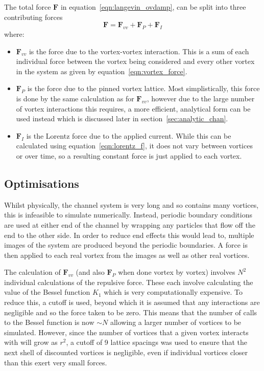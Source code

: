 \documentclass{article}
\numberwithin{equation}{section}
\begin{document}
The total force $\mathbf{F}$ in equation~\ref{eqn:langevin_ovdamp}, can be split into three contributing forces
\begin{equation}
    \mathbf{F} = \mathbf{F}_{vv} + \mathbf{F}_P + \mathbf{F}_I
\end{equation}
where:
\begin{itemize}
    \item $\mathbf{F}_{vv}$ is the force due to the vortex-vortex interaction. This is a sum of each individual force between the vortex being considered and every other vortex in the system as given by equation~\ref{eqn:vortex_force}.
    \item $\mathbf{F}_P$ is the force due to the pinned vortex lattice. Most simplistically, this force is done by the same calculation as for $\mathbf{F}_{vv}$, however due to the large number of vortex interactions this requires, a more efficient, analytical form can be used instead which is discussed later in section~\ref{sec:analytic_chan}.
    \item $\mathbf{F}_I$ is the Lorentz force due to the applied current. While this can be calculated using equation~\ref{eqn:lorentz_f}, it does not vary between vortices or over time, so a resulting constant force is just applied to each vortex.
\end{itemize}

\subsection{Optimisations}
Whilst physically, the channel system is very long and so contains many vortices, this is infeasible to simulate numerically. Instead, periodic boundary conditions are used at either end of the channel by wrapping any particles that flow off the end to the other side. In order to reduce end effects this would lead to, multiple images of the system are produced beyond the periodic boundaries. A force is then applied to each real vortex from the images as well as other real vortices.

The calculation of $\mathbf{F}_{vv}$ (and also $\mathbf{F}_P$ when done vortex by vortex) involves $N^2$ individual calculations of the repulsive force. These each involve calculating the value of the Bessel function $K_1$ which is very computationally expensive. To reduce this, a cutoff is used, beyond which it is assumed that any interactions are negligible and so the force taken to be zero. This means that the number of calls to the Bessel function is now $\sim N$ allowing a larger number of vortices to be simulated. However, since the number of vortices that a given vortex interacts with will grow as $r^2$, a cutoff of 9 lattice spacings was used to ensure that the next shell of discounted vortices is negligible, even if individual vortices closer than this exert very small forces.
\end{document}
